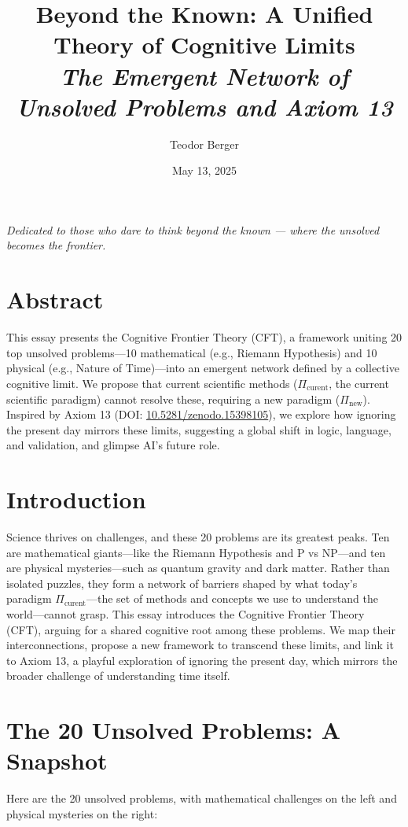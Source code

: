 \documentclass[12pt]{article}
\title{\Huge \textbf{Beyond the Known: A Unified Theory of Cognitive Limits} \\ 
\large \textit{The Emergent Network of Unsolved Problems and Axiom 13}}
\author{Teodor Berger}
\date{May 13, 2025}
\begin{document}
\maketitle

\begin{center}
\textit{Dedicated to those who dare to think beyond the known — where the unsolved becomes the frontier.}
\end{center}

\vspace{1cm}

\section*{Abstract}
This essay presents the Cognitive Frontier Theory (CFT), a framework uniting 20 top unsolved problems—10 mathematical (e.g., Riemann Hypothesis) and 10 physical (e.g., Nature of Time)—into an emergent network defined by a collective cognitive limit. We propose that current scientific methods (\(\Pi_{\text{curent}}\), the current scientific paradigm) cannot resolve these, requiring a new paradigm (\(\Pi_{\text{new}}\)). Inspired by Axiom 13 (DOI: \href{https://doi.org/10.5281/zenodo.15398105}{10.5281/zenodo.15398105}), we explore how ignoring the present day mirrors these limits, suggesting a global shift in logic, language, and validation, and glimpse AI’s future role.

\section*{Introduction}
Science thrives on challenges, and these 20 problems are its greatest peaks. Ten are mathematical giants—like the Riemann Hypothesis and P vs NP—and ten are physical mysteries—such as quantum gravity and dark matter. Rather than isolated puzzles, they form a network of barriers shaped by what today’s paradigm \(\Pi_{\text{curent}}\)—the set of methods and concepts we use to understand the world—cannot grasp. This essay introduces the Cognitive Frontier Theory (CFT), arguing for a shared cognitive root among these problems. We map their interconnections, propose a new framework to transcend these limits, and link it to Axiom 13, a playful exploration of ignoring the present day, which mirrors the broader challenge of understanding time itself.

\section*{The 20 Unsolved Problems: A Snapshot}
Here are the 20 unsolved problems, with mathematical challenges on the left and physical mysteries on the right:
\end{document}
